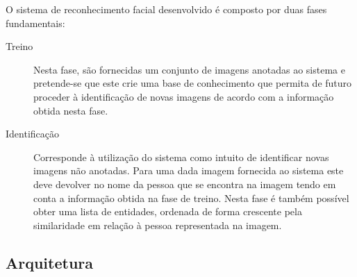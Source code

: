 O sistema de reconhecimento facial desenvolvido é composto por duas fases fundamentais:
\begin{description}
\item[Treino] Nesta fase, são fornecidas um conjunto de imagens anotadas ao sistema e pretende-se que este crie uma base de conhecimento que permita de futuro proceder à identificação de novas imagens de acordo com a informação obtida nesta fase.
\item[Identificação] Corresponde à utilização do sistema como intuito de identificar novas imagens não anotadas. Para uma dada imagem fornecida ao sistema este deve devolver no nome da pessoa que se encontra na imagem tendo em conta a informação obtida na fase de treino. Nesta fase é também possível obter uma lista de entidades, ordenada de forma crescente pela similaridade em relação à pessoa representada na imagem.
\end{description}

\subsection{Arquitetura}

